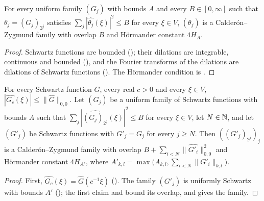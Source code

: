 \begin{theorem}
\label{thm:cz-family-dilation}
\leanok
{}
For every uniform family $(G_j)$ with bounds $A$ and every $B \in [0, \infty]$ such that
$\theta_j = (G_j)_{2^j}$ satisfies $\sum_j |\widehat{\theta_j}(\xi)|^2 \leq B$ for every
$\xi \in V$, $(\theta_j)$ is a Calder\'on--Zygmund family with overlap $B$ and H\"ormander
constant $4 H_A$.
\end{theorem}

\begin{proof}
\leanok
Schwartz functions are bounded (); their dilations are integrable,
continuous and bounded (), and the Fourier transforms of the dilations are
dilations of Schwartz functions (). The
H\"ormander condition is .
\end{proof}

\begin{lemma}
\label{lem:cz-family-exceptions}
\leanok
{}
For every Schwartz function
$G$, every real $c > 0$ and every $\xi \in V$,
$|\widehat{G_c}(\xi)| \leq \|\widehat G\|_{0,0}$. Let $(G_j)$ be a uniform family of Schwartz
functions with bounds $A$ such that $\sum_j |\widehat{(G_j)_{2^j}}(\xi)|^2 \leq B$ for every
$\xi \in V$, let $N \in \mathbb{N}$, and let $(G'_j)$ be Schwartz functions with $G'_j = G_j$ for every
$j \geq N$. Then $((G'_j)_{2^j})_j$ is a Calder\'on--Zygmund family with overlap
$B + \sum_{i < N} \|\widehat{G'_i}\|_{0,0}^2$ and H\"ormander constant $4 H_{A'}$, where
$A'_{k,l} = \max\bigl(A_{k,l}, \sum_{i < N} \|G'_i\|_{k,l}\bigr)$.
\end{lemma}

\begin{proof}
\leanok
First, $\widehat{G_c}(\xi) = \widehat G(c^{-1} \xi)$ (). The family
$(G'_j)$ is uniformly Schwartz with bounds $A'$ (); the
first claim and  bound its overlap, and
 gives the family.
\end{proof}

